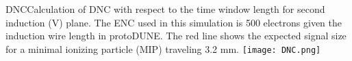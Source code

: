 \begin{cdrfigure}{DNC}{Calculation of DNC with respect to the time window length for second induction (V) plane. 
The ENC used in this simulation is 500 electrons given the induction wire length in protoDUNE. 
The red line shows the expected signal size for a minimal ionizing particle (MIP) 
traveling 3.2 mm.}
\texttt{[image: DNC.png]}
\end{cdrfigure}


